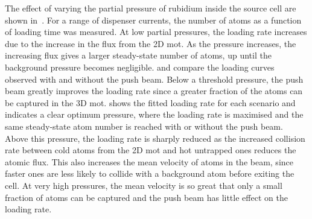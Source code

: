 \par\noindent
The effect of varying the partial pressure of rubidium inside the source cell
are shown in~. For a range of dispenser currents,
the number of atoms as a function of loading time was measured. At low partial
pressures, the loading rate increases due to the increase in the flux from the
2D \ac{mot}. As the pressure increases, the increasing flux gives a larger
steady-state number of atoms, up until the background pressure becomes
negligible.  and  compare the
loading curves observed with and without the push beam. Below a threshold
pressure, the push beam greatly improves the loading rate since a greater
fraction of the atoms can be captured in the 3D \ac{mot}.
 shows the fitted loading rate for each scenario and
indicates a clear optimum pressure, where the loading rate is maximised and the
same steady-state atom number is reached with or without the push beam. Above
this pressure, the loading rate is sharply reduced as the increased collision
rate between cold atoms from the 2D \ac{mot} and hot untrapped ones reduces the
atomic flux. This also increases the mean velocity of atoms in the beam, since
faster ones are less likely to collide with a background atom before exiting the
cell. At very high pressures, the mean velocity is so great that only a small
fraction of atoms can be captured and the push beam has little effect on the loading rate.
